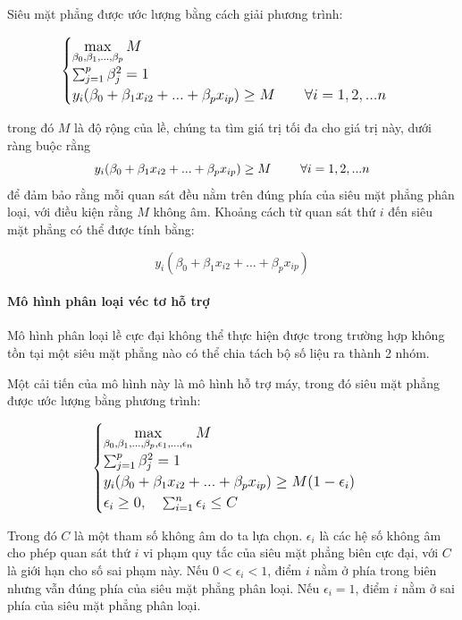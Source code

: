 Siêu mặt phẳng được ước lượng bằng cách giải phương trình:


 $$
\large
\begin{cases}
\max\limits_{\beta_0, \beta_1,...,\beta_p}M\\

\sum_{j = 1}^p \beta_j^2 = 1\\

y_i(\beta_0 + \beta_1x_{i2} + ... + \beta_px_{ip}) \geq M \qquad \forall i = 1, 2, ...n
\end{cases}
$$

trong đó $M$ là độ rộng của lề, chúng ta tìm giá trị tối đa cho giá trị này, dưới ràng buộc rằng 
 $$
\large
y_i(\beta_0 + \beta_1x_{i2} + ... + \beta_px_{ip}) \geq M \qquad \forall i = 1, 2, ...n
$$
để đảm bảo rằng mỗi quan sát đều nằm trên đúng phía của siêu mặt phẳng phân loại, với điều kiện rằng $M$ không âm.
Khoảng cách từ quan sát thứ $i$ đến siêu mặt phẳng có thể được tính bằng: 

$$
y_i(\beta_0 + \beta_1x_{i2} + ... + \beta_px_{ip})
$$


\paragraph{Mô hình phân loại véc tơ hỗ trợ}

Mô hình phân loại lề cực đại không thể thực hiện được trong trường hợp không tồn tại một siêu mặt phẳng nào có thể chia tách bộ số liệu ra thành 2 nhóm.

Một cải tiến của mô hình này là mô hình hỗ trợ máy, trong đó siêu mặt phẳng được ước lượng bằng phương trình:

$$
\large
\begin{cases}
\max\limits_{\beta_0, \beta_1,...,\beta_p, \epsilon_1, ... , \epsilon_n}M\\

\sum_{j = 1}^p \beta_j^2 = 1\\

y_i(\beta_0 + \beta_1x_{i2} + ... + \beta_px_{ip}) \geq M(1-\epsilon_i) \\

\epsilon_i \geq 0, \quad \sum_{i = 1}^n \epsilon_i \leq C
\end{cases}
$$

Trong đó $C$ là một tham số không âm do ta lựa chọn. $\epsilon_i$ là các hệ số không âm cho phép quan sát thứ $i$ vi phạm quy tắc của siêu mặt phẳng biên cực đại, với $C$ là giới hạn cho số sai phạm này. Nếu $0 < \epsilon_i < 1$, điểm $i$ nằm ở phía trong biên nhưng vẫn đúng phía của siêu mặt phẳng phân loại. Nếu $\epsilon_i = 1$, điểm $i$ nằm ở sai phía của siêu mặt phẳng phân loại.

